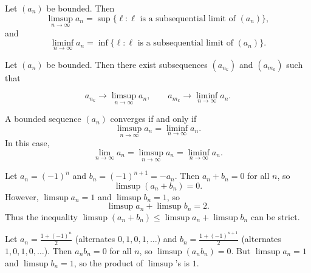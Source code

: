 \begin{theorem}
Let $(a_n)$ be bounded. Then
\[
\limsup_{n\to\infty} a_n
=
\sup \{ \ell : \ell \text{ is a subsequential limit of } (a_n) \},
\]
and
\[
\liminf_{n\to\infty} a_n
=
\inf \{ \ell : \ell \text{ is a subsequential limit of } (a_n) \}.
\]
\end{theorem}



\begin{theorem}
Let $(a_n)$ be bounded. Then there exist subsequences
$(a_{n_k})$ and $(a_{m_k})$ such that

\[
a_{n_k} \to \limsup_{n\to\infty} a_n,
\qquad
a_{m_k} \to \liminf_{n\to\infty} a_n.
\]
\end{theorem}



\begin{theorem}
A bounded sequence $(a_n)$ converges if and only if
\[
\limsup_{n\to\infty} a_n
=
\liminf_{n\to\infty} a_n.
\]
In this case,
\[
\lim_{n\to\infty} a_n
=
\limsup_{n\to\infty} a_n
=
\liminf_{n\to\infty} a_n.
\]
\end{theorem}


\begin{tcolorbox}[colback=propbox, colframe=propborder, arc=2pt,
  left=6pt, right=6pt, top=4pt, bottom=4pt,
  title={\small\textbf{Example (Strict inequality in subadditivity)}},
  fonttitle=\small\bfseries]
Let $a_n = (-1)^n$ and $b_n = (-1)^{n+1} = -a_n$. Then $a_n + b_n = 0$ for all $n$, so
\[
\limsup(a_n + b_n) = 0.
\]
However, $\limsup a_n = 1$ and $\limsup b_n = 1$, so
\[
\limsup a_n + \limsup b_n = 2.
\]
Thus the inequality $\limsup(a_n + b_n) \le \limsup a_n + \limsup b_n$ can be strict.
\end{tcolorbox}

\begin{tcolorbox}[colback=propbox, colframe=propborder, arc=2pt,
  left=6pt, right=6pt, top=4pt, bottom=4pt,
  title={\small\textbf{Example (Strict inequality in product rule)}},
  fonttitle=\small\bfseries]
Let $a_n = \frac{1 + (-1)^n}{2}$ (alternates $0, 1, 0, 1, \ldots$) and 
$b_n = \frac{1 + (-1)^{n+1}}{2}$ (alternates $1, 0, 1, 0, \ldots$).
Then $a_n b_n = 0$ for all $n$, so $\limsup(a_n b_n) = 0$.
But $\limsup a_n = 1$ and $\limsup b_n = 1$, so the product of $\limsup$'s is $1$.
\end{tcolorbox}

